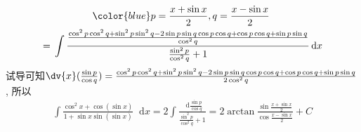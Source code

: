 \documentclass{ctexbook}
\newcommand*{\dif}{\mathop{}\!\mathrm{d}}
\begin{document}
{\begin{align*}
{}&\qquad\qquad{}{\color{blue}p=\frac{x+\sin{x}}{2},q=\frac{x-\sin{x}}{2}}\\
={}&\int\frac{\frac{\cos^{2}{p}\cos^{2}{q}+\sin^{2}{p}\sin^{2}{q}-2\sin{p}\sin{q}\cos{p}\cos{q}+\cos{p}\cos{q}+\sin{p}\sin{q}}{\cos^{2}{q}}}{\frac{\sin^{2}{p}}{\cos^{2}{q}}+1}\dif{x}\\
\end{align*}
试导可知$\dv{x}(\frac{\sin{p}}{\cos{q}})=\frac{\cos^{2}{p}\cos^{2}{q}+\sin^{2}{p}\sin^{2}{q}-2\sin{p}\sin{q}\cos{p}\cos{q}+\cos{p}\cos{q}+\sin{p}\sin{q}}{2\cos^{2}{q}}$, 所以
\begin{align*}
\int\frac{\cos^{2}{x}+\cos(\sin{x})}{1+\sin{x}\sin(\sin{x})}\dif{x}=2\int\frac{\dif{\frac{\sin{p}}{\cos{q}}}}{\frac{\sin^{2}{p}}{\cos^{2}{q}}+1}=2\arctan{\frac{\sin{\frac{x+\sin{x}}{2}}}{\cos{\frac{x-\sin{x}}{2}}}}+C
\end{align*}\par
\newpage
}\appendix{
\pagestyle{headings}
}
\end{document}

